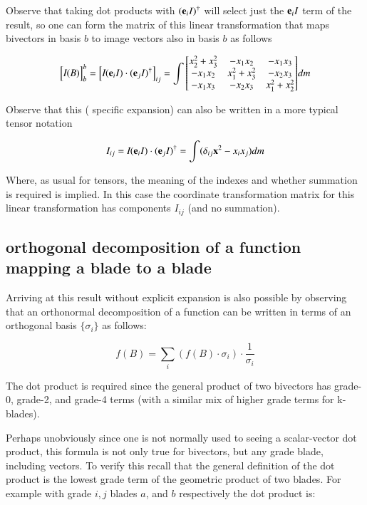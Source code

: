 \documentclass{article}      %
\begin{document}
Observe that taking dot products with $(\mathbf{e}_i I)^\dagger$ will select just the $\mathbf{e}_i I$ term of the result, so one can
form the matrix of this linear transformation that maps bivectors in basis $b$ to image vectors also in basis $b$ as follows

\[
{\begin{bmatrix}
\emph{I}(B)
\end{bmatrix}}_{b}^{b}
=
{\begin{bmatrix}
\emph{I}(\mathbf{e}_i I) \cdot (\mathbf{e}_j I)^\dagger
\end{bmatrix}}_{ij}
=
\int {\begin{bmatrix}
x_2^2 + x_3^2  & - x_1 x_2  & - x_1 x_3 \\
-x_1 x_2  & x_1^2 + x_3^2  & - x_2 x_3  \\
-x_1 x_3  & -x_2 x_3  & x_1^2 + x_2^2  \\
\end{bmatrix}} dm
\]

Observe that this ( specific expansion) can also be written in a more
typical tensor notation

\[
I_{ij} 
= \emph{I}(\mathbf{e}_i I) \cdot (\mathbf{e}_j I)^\dagger 
= \int (\delta_{ij} \mathbf{x}^2 - x_i x_j) dm
\]

Where, as usual for tensors, the meaning of the indexes and whether summation is required is implied.  In this case
the coordinate transformation matrix for this linear transformation has components $I_{ij}$ (and no summation).

\subsection{ orthogonal decomposition of a function mapping a blade to a blade }

Arriving at this result without explicit expansion is also possible by observing that an orthonormal decomposition of a 
function can be written in terms of an orthogonal basis $\{\sigma_i\}$ as follows:

\begin{equation}
f(B) = \sum_i (f(B) \cdot \sigma_i) \cdot \frac{1}{\sigma_i}
\end{equation}\label{eqn:bladeOrthogDecomp}

The dot product is required since the general product of two bivectors has grade-0, grade-2, and grade-4 terms (with a similar mix of higher grade terms for k-blades).

Perhaps unobviously since one is not normally used to seeing a scalar-vector dot product, this formula is not only true for bivectors, but any grade blade, including
vectors.  To verify this recall that the 
general definition of the dot product is the lowest grade term of the geometric product of two blades.  For example with grade $i,j$ blades $a$, and $b$ respectively
the dot product is:
\end{document}
